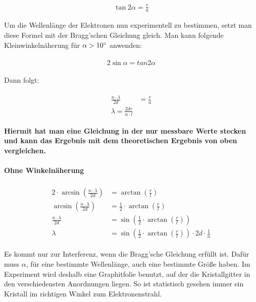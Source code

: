 \begin{align}
	\tan{2\alpha} = \frac{r}{a}
\end{align}

Um die Wellenlänge der Elektronen nun experimentell zu bestimmen, setzt man diese Formel mit der Bragg'schen Gleichung gleich. Man kann folgende Kleinwinkelnäherung für $\alpha > 10\degree$ anwenden:

\begin{align}
\begin{split}
	2\sin{\alpha} = tan{2\alpha}
\end{split}
\end{align}

\noindent Dann folgt:

\begin{align}
\begin{split}
	\frac{n\cdot\lambda}{2d} &= \frac{r}{a} \\
	\lambda = \frac{2dr}{n\cdot l}
\end{split}
\end{align}

\noindent \textbf{Hiermit hat man eine Gleichung in der nur messbare Werte stecken und kann das Ergebnis mit dem theoretischen Ergebnis von oben vergleichen.}

\paragraph{Ohne Winkelnäherung}

\begin{align}
\begin{split}
	2\cdot\arcsin(\frac{n\cdot \lambda}{2d}) &= \arctan(\frac{r}{l})  \\
	\arcsin(\frac{n\cdot \lambda}{2d}) &= \frac{1}{2}\cdot\arctan(\frac{r}{l}) \\
	\frac{n\cdot \lambda}{2d} &= \sin(\frac{1}{2}\cdot\arctan(\frac{r}{l})) \\
	\lambda &= \sin(\frac{1}{2}\cdot\arctan(\frac{r}{l}))\cdot 2d \cdot \frac{1}{n}
\end{split}
\end{align}

\begin{NiceToKnow}
Es kommt nur zur Interferenz, wenn die Bragg'sche Gleichung erfüllt ist. Dafür muss $\alpha$, für eine bestimmte Wellenlänge, auch eine bestimmte Größe haben. Im Experiment wird deshalb eine Graphitfolie benutzt, auf der die Kristallgitter in den verschiedensten Anordnungen liegen. So ist statistisch gesehen immer ein Kristall im richtigen Winkel zum Elektronenstrahl.
\end{NiceToKnow}


